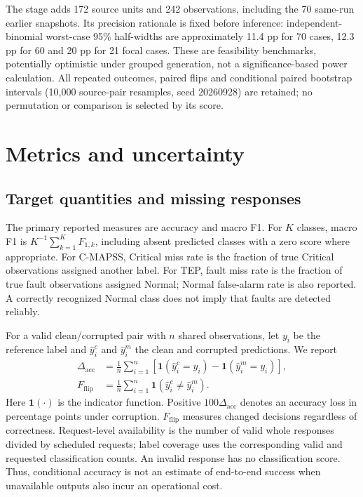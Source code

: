 \documentclass[11pt,a4paper]{article}
\begin{document}
The stage adds 172 source units and 242 observations, including the 70 same-run earlier snapshots. Its precision rationale is fixed before inference: independent-binomial worst-case 95\% half-widths are approximately 11.4 pp for 70 cases, 12.3 pp for 60 and 20 pp for 21 focal cases. These are feasibility benchmarks, potentially optimistic under grouped generation, not a significance-based power calculation. All repeated outcomes, paired flips and conditional paired bootstrap intervals (10,000 source-pair resamples, seed 20260928) are retained; no permutation or comparison is selected by its score.

\section{Metrics and uncertainty}
\subsection{Target quantities and missing responses}
The primary reported measures are accuracy and macro F1. For $K$ classes, macro F1 is $K^{-1}\sum_{k=1}^K F_{1,k}$, including absent predicted classes with a zero score where appropriate. For C-MAPSS, Critical miss rate is the fraction of true Critical observations assigned another label. For TEP, fault miss rate is the fraction of true fault observations assigned Normal; Normal false-alarm rate is also reported. A correctly recognized Normal class does not imply that faults are detected reliably.

For a valid clean/corrupted pair with $n$ shared observations, let $y_i$ be the reference label and $\hat y_i^{c}$ and $\hat y_i^{m}$ the clean and corrupted predictions. We report
\begin{align}
\Delta_{\mathrm{acc}} &= \frac{1}{n}\sum_{i=1}^{n}\left[\mathbf{1}(\hat y_i^{c}=y_i)-\mathbf{1}(\hat y_i^{m}=y_i)\right],\\
F_{\mathrm{flip}} &= \frac{1}{n}\sum_{i=1}^{n}\mathbf{1}(\hat y_i^{c}\neq\hat y_i^{m}).
\end{align}
Here $\mathbf{1}(\cdot)$ is the indicator function. Positive $100\Delta_{\mathrm{acc}}$ denotes an accuracy loss in percentage points under corruption. $F_{\mathrm{flip}}$ measures changed decisions regardless of correctness. Request-level availability is the number of valid whole responses divided by scheduled requests; label coverage uses the corresponding valid and requested classification counts. An invalid response has no classification score. Thus, conditional accuracy is not an estimate of end-to-end success when unavailable outputs also incur an operational cost.
\end{document}
